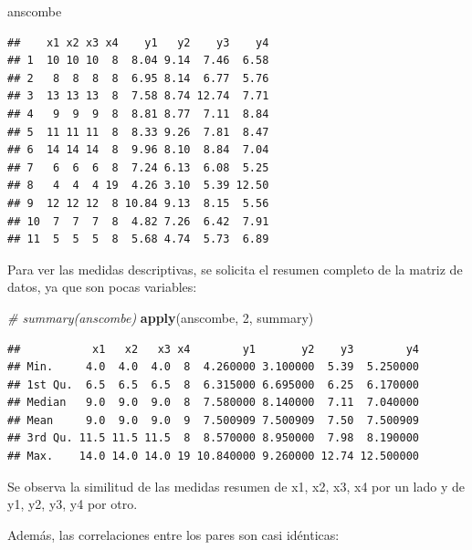 \documentclass[]{book}
\newenvironment{Shaded}{\begin{snugshade}}{\end{snugshade}}
\newcommand{\CommentTok}[1]{\textcolor[rgb]{0.56,0.35,0.01}{\textit{#1}}}
\newcommand{\DecValTok}[1]{\textcolor[rgb]{0.00,0.00,0.81}{#1}}
\newcommand{\KeywordTok}[1]{\textcolor[rgb]{0.13,0.29,0.53}{\textbf{#1}}}
\newcommand{\NormalTok}[1]{#1}
\newcommand{\OperatorTok}[1]{\textcolor[rgb]{0.81,0.36,0.00}{\textbf{#1}}}
\begin{document}
\begin{Shaded}
\begin{Highlighting}[]
\NormalTok{anscombe}
\end{Highlighting}
\end{Shaded}

\begin{verbatim}
##    x1 x2 x3 x4    y1   y2    y3    y4
## 1  10 10 10  8  8.04 9.14  7.46  6.58
## 2   8  8  8  8  6.95 8.14  6.77  5.76
## 3  13 13 13  8  7.58 8.74 12.74  7.71
## 4   9  9  9  8  8.81 8.77  7.11  8.84
## 5  11 11 11  8  8.33 9.26  7.81  8.47
## 6  14 14 14  8  9.96 8.10  8.84  7.04
## 7   6  6  6  8  7.24 6.13  6.08  5.25
## 8   4  4  4 19  4.26 3.10  5.39 12.50
## 9  12 12 12  8 10.84 9.13  8.15  5.56
## 10  7  7  7  8  4.82 7.26  6.42  7.91
## 11  5  5  5  8  5.68 4.74  5.73  6.89
\end{verbatim}

Para ver las medidas descriptivas, se solicita el resumen completo de la matriz de datos, ya que son pocas variables:

\begin{Shaded}
\begin{Highlighting}[]
\CommentTok{# summary(anscombe)}
\KeywordTok{apply}\NormalTok{(anscombe, }\DecValTok{2}\NormalTok{, summary)}
\end{Highlighting}
\end{Shaded}

\begin{verbatim}
##           x1   x2   x3 x4        y1       y2    y3        y4
## Min.     4.0  4.0  4.0  8  4.260000 3.100000  5.39  5.250000
## 1st Qu.  6.5  6.5  6.5  8  6.315000 6.695000  6.25  6.170000
## Median   9.0  9.0  9.0  8  7.580000 8.140000  7.11  7.040000
## Mean     9.0  9.0  9.0  9  7.500909 7.500909  7.50  7.500909
## 3rd Qu. 11.5 11.5 11.5  8  8.570000 8.950000  7.98  8.190000
## Max.    14.0 14.0 14.0 19 10.840000 9.260000 12.74 12.500000
\end{verbatim}

Se observa la similitud de las medidas resumen de x1, x2, x3, x4 por un lado y de y1, y2, y3, y4 por otro.

Además, las correlaciones entre los pares son casi idénticas:

\begin{Shaded}
\end{Shaded}
\end{document}

